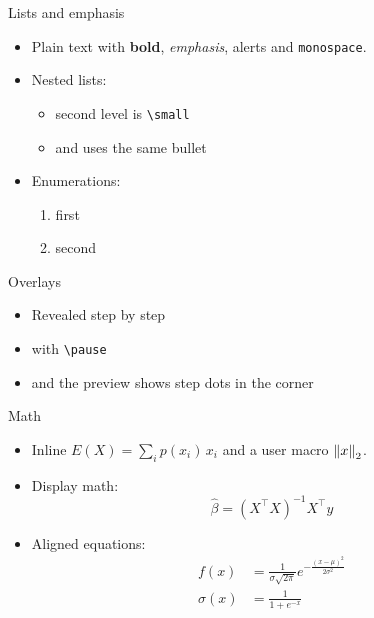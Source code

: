 \begin{frame}{Lists and emphasis}
  \begin{itemize}
    \setlength{\itemsep}{3mm}
    \item Plain text with \textbf{bold}, \emph{emphasis}, \alert{alerts} and \texttt{monospace}.
    \item Nested lists:
    \begin{itemize}
      \item second level is \texttt{\textbackslash small}
      \item and uses the same bullet
    \end{itemize}
    \item Enumerations:
    \begin{enumerate}
      \item first
      \item second
    \end{enumerate}
  \end{itemize}
\end{frame}

\begin{frame}{Overlays}
  \begin{itemize}
    \item Revealed step by step \pause
    \item with \texttt{\textbackslash pause} \pause
    \item and the preview shows step dots in the corner
  \end{itemize}
  \begin{center}
  \end{center}
\end{frame}

\begin{frame}{Math}
  \begin{itemize}
    \item Inline $E(X) = \sum_i p(x_i)\, x_i$ and a user macro $\left\lVert x\right\rVert_2$.
    \item Display math:
    $$\hat{\beta} = \left(X^\top X\right)^{-1} X^\top y$$
    \item Aligned equations:
    \begin{align*}
      f(x) &= \frac{1}{\sigma\sqrt{2\pi}} e^{-\frac{(x-\mu)^2}{2\sigma^2}} \\
      \sigma(x) &= \frac{1}{1+e^{-x}}
    \end{align*}
  \end{itemize}
\end{frame}

